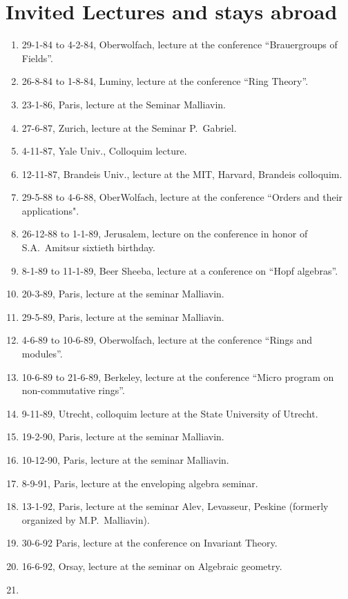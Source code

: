 \documentclass{amsart}
\begin{document}
\section*{Invited Lectures and stays abroad}
\begin{enumerate}
\item
29-1-84 to 4-2-84, Oberwolfach, lecture at the
conference ``Brauergroups of Fields''.
\item
26-8-84 to 1-8-84, Luminy, lecture at the
conference ``Ring Theory''.
\item
23-1-86, Paris, lecture at the Seminar Malliavin.
\item
27-6-87, Zurich, lecture at the Seminar P.~Gabriel.
\item
4-11-87, Yale Univ., Colloquim lecture.
\item
12-11-87, Brandeis Univ., lecture at the MIT, Harvard, Brandeis colloquim.
\item
29-5-88 to 4-6-88, OberWolfach, lecture at the conference
``Orders and their applications".
\item
26-12-88 to 1-1-89,
Jerusalem, lecture on the conference in honor of S.A.\ Amitsur sixtieth
birthday.
\item
8-1-89 to 11-1-89, Beer Sheeba, lecture at a conference on ``Hopf
algebras''. 
\item
20-3-89, Paris, lecture at the  seminar Malliavin.
\item
29-5-89, Paris, lecture at the  seminar Malliavin.
\item
4-6-89 to 10-6-89, Oberwolfach, lecture at the conference
``Rings and modules''.
\item
10-6-89 to 21-6-89, Berkeley, lecture at the conference ``Micro
program on non-commutative rings''.
\item
9-11-89, Utrecht, colloquim lecture at the State University of Utrecht.
\item
19-2-90, Paris, lecture at the seminar Malliavin.
\item
10-12-90, Paris, lecture at the seminar Malliavin.
\item
8-9-91, Paris, lecture at the enveloping algebra seminar.
\item
13-1-92, Paris, lecture at the seminar Alev, Levasseur, Peskine (formerly
organized by M.P.\ Malliavin).
\item
30-6-92 Paris, lecture at the conference on Invariant Theory.
\item
16-6-92, Orsay, lecture at the seminar on Algebraic geometry.
\item

\end{enumerate}
\end{document}
